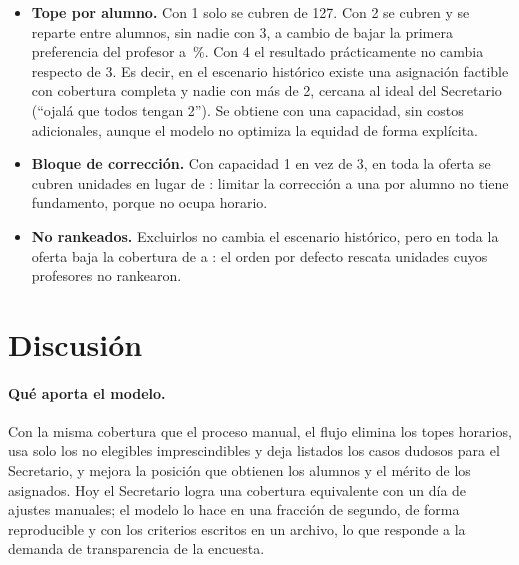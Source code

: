 \documentclass{article}
\begin{document}
\begin{table}[H]
\centering
\small
\resizebox{\textwidth}{!}{}
\caption{Efecto del tope por alumno, de la capacidad del bloque de corrección y de incluir a los no rankeados, en el escenario histórico (127 cupos) y en toda la oferta.}
\label{tab:capacidades}
\end{table}

\begin{itemize}
    \item \textbf{Tope por alumno.} Con 1 solo se cubren \capUnoCub{} de 127. Con 2 se cubren \capDosCub{} y se reparte entre \capDosAlumnos{} alumnos, sin nadie con 3, a cambio de bajar la primera preferencia del profesor a \capDosPrim\,\%. Con 4 el resultado prácticamente no cambia respecto de 3. Es decir, en el escenario histórico existe una asignación factible con cobertura completa y nadie con más de 2, cercana al ideal del Secretario (``ojalá que todos tengan 2''). Se obtiene con una capacidad, sin costos adicionales, aunque el modelo no optimiza la equidad de forma explícita.
    \item \textbf{Bloque de corrección.} Con capacidad 1 en vez de 3, en toda la oferta se cubren \capCorrUnoOf{} unidades en lugar de \capBaseOf: limitar la corrección a una por alumno no tiene fundamento, porque no ocupa horario.
    \item \textbf{No rankeados.} Excluirlos no cambia el escenario histórico, pero en toda la oferta baja la cobertura de \capBaseOf{} a \capSinRankOf: el orden por defecto rescata unidades cuyos profesores no rankearon.
\end{itemize}

\section{Discusión}

\paragraph{Qué aporta el modelo.} Con la misma cobertura que el proceso manual, el flujo elimina los topes horarios, usa solo los no elegibles imprescindibles y deja listados los casos dudosos para el Secretario, y mejora la posición que obtienen los alumnos y el mérito de los asignados. Hoy el Secretario logra una cobertura equivalente con un día de ajustes manuales; el modelo lo hace en una fracción de segundo, de forma reproducible y con los criterios escritos en un archivo, lo que responde a la demanda de transparencia de la encuesta.
\end{document}

